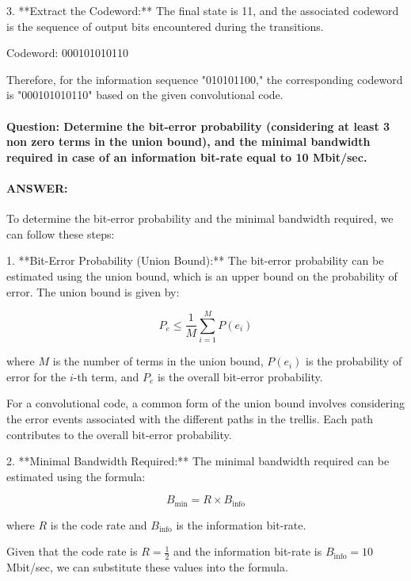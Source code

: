 \documentclass[colorlinks,11pt,a4paper,normalphoto,withhyper,ragged2e]{altareport}
\begin{document}
				3. **Extract the Codeword:**
				The final state is 11, and the associated codeword is the sequence of output bits encountered during the transitions.
				
				Codeword: 000101010110
				
				Therefore, for the information sequence "010101100," the corresponding codeword is "000101010110" based on the given convolutional code.
				
				
				
				
				
				\paragraph{Question: Determine the bit-error probability (considering at least 3 non zero terms in the union bound), and the minimal bandwidth required in case of an information bit-rate equal to 10 Mbit/sec.}
				\paragraph{ANSWER:}
				
				To determine the bit-error probability and the minimal bandwidth required, we can follow these steps:
				
				1. **Bit-Error Probability (Union Bound):**
				The bit-error probability can be estimated using the union bound, which is an upper bound on the probability of error. The union bound is given by:
				
				\[
				P_e \leq \frac{1}{M} \sum_{i=1}^{M} P(e_i)
				\]
				
				where \(M\) is the number of terms in the union bound, \(P(e_i)\) is the probability of error for the \(i\)-th term, and \(P_e\) is the overall bit-error probability.
				
				For a convolutional code, a common form of the union bound involves considering the error events associated with the different paths in the trellis. Each path contributes to the overall bit-error probability.
				
				2. **Minimal Bandwidth Required:**
				The minimal bandwidth required can be estimated using the formula:
				
				\[
				B_{\text{min}} = R \times B_{\text{info}}
				\]
				
				where \(R\) is the code rate and \(B_{\text{info}}\) is the information bit-rate.
				
				Given that the code rate is \(R = \frac{1}{2}\) and the information bit-rate is \(B_{\text{info}} = 10\) Mbit/sec, we can substitute these values into the formula.
				
\end{document}
